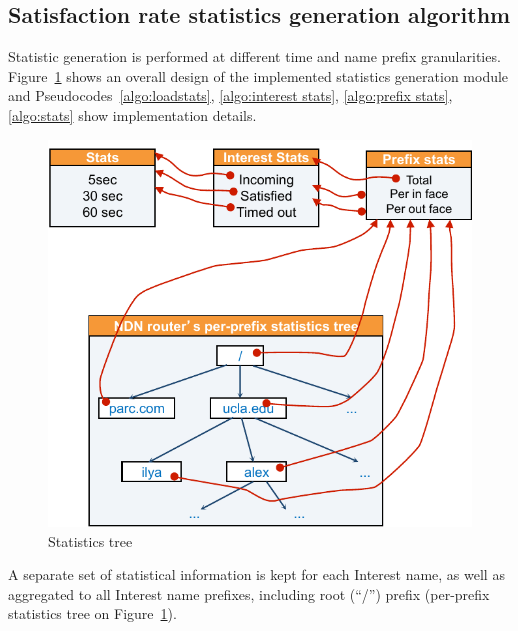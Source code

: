 \subsection{Satisfaction rate statistics generation algorithm}
\label{sec:stats}

Statistic generation is performed at different time and name prefix granularities.  
Figure~\ref{fig:stats tree} shows an overall design of the implemented statistics generation module and Pseudocodes~\ref{algo:loadstats}, \ref{algo:interest stats}, \ref{algo:prefix stats}, \ref{algo:stats} show implementation details.

\begin{figure}[htpb]
  \centering
  \includegraphics[scale=0.7]{figures/stats-illustration.pdf}
  \caption{Statistics tree}
  \label{fig:stats tree}
\end{figure}

A separate set of statistical information is kept for each Interest name, as well as aggregated to all Interest name prefixes, including root (``/'') prefix (per-prefix statistics tree on Figure~\ref{fig:stats tree}).



